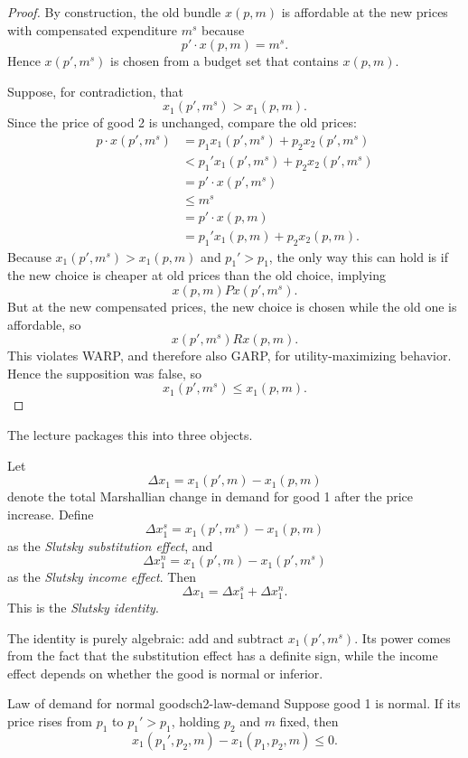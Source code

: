 \begin{proof}
By construction, the old bundle $x(p,m)$ is affordable at the new prices with compensated expenditure $m^s$ because
\[
p' \cdot x(p,m) = m^s.
\]
Hence $x(p',m^s)$ is chosen from a budget set that contains $x(p,m)$.

Suppose, for contradiction, that
\[
x_1(p',m^s) > x_1(p,m).
\]
Since the price of good 2 is unchanged, compare the old prices:
\begin{align*}
p \cdot x(p',m^s)
&= p_1 x_1(p',m^s) + p_2 x_2(p',m^s) \\
&< p_1' x_1(p',m^s) + p_2 x_2(p',m^s) \\
&= p' \cdot x(p',m^s) \\
&\le m^s \\
&= p' \cdot x(p,m) \\
&= p_1' x_1(p,m) + p_2 x_2(p,m).
\end{align*}
Because $x_1(p',m^s) > x_1(p,m)$ and $p_1' > p_1$, the only way this can hold is if the new choice is cheaper at old prices than the old choice, implying
\[
x(p,m) P x(p',m^s).
\]
But at the new compensated prices, the new choice is chosen while the old one is affordable, so
\[
x(p',m^s) R x(p,m).
\]
This violates WARP, and therefore also GARP, for utility-maximizing behavior. Hence the supposition was false, so
\[
x_1(p',m^s) \le x_1(p,m).
\]
\end{proof}

The lecture packages this into three objects.

\begin{keyformula}[title={Key Formula: Slutsky Decomposition}]
Let
\[
\Delta x_1 = x_1(p',m) - x_1(p,m)
\]
denote the total Marshallian change in demand for good 1 after the price increase. Define
\[
\Delta x_1^s = x_1(p',m^s) - x_1(p,m)
\]
as the \emph{Slutsky substitution effect}, and
\[
\Delta x_1^n = x_1(p',m) - x_1(p',m^s)
\]
as the \emph{Slutsky income effect}. Then
\[
\Delta x_1 = \Delta x_1^s + \Delta x_1^n.
\]
This is the \emph{Slutsky identity}.
\end{keyformula}

The identity is purely algebraic: add and subtract $x_1(p',m^s)$. Its power comes from the fact that the substitution effect has a definite sign, while the income effect depends on whether the good is normal or inferior.

\begin{theorem}{Law of demand for normal goods}{ch2-law-demand}
Suppose good 1 is normal. If its price rises from $p_1$ to $p_1' > p_1$, holding $p_2$ and $m$ fixed, then
\[
x_1(p_1',p_2,m) - x_1(p_1,p_2,m) \le 0.
\]
\end{theorem}

